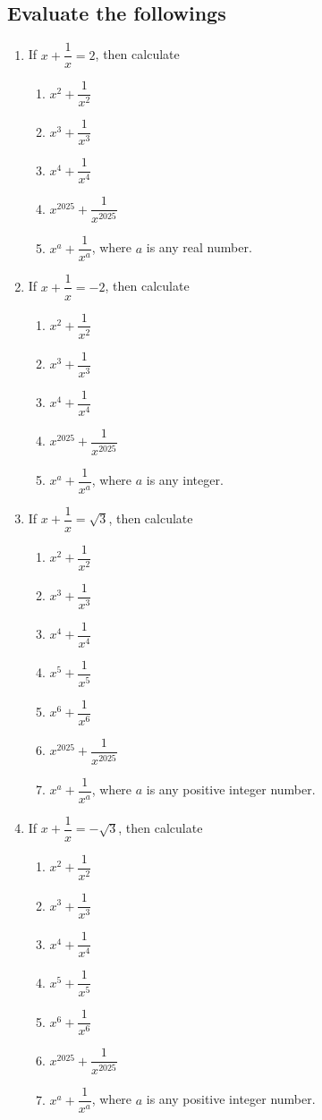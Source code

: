 \documentclass[12pt,a4paper,twoside]{book}
\begin{document}
	\subsection{Evaluate the followings}
		\begin{enumerate}
			\item If $x+\dfrac{1}{x}= 2$, then calculate \begin{enumerate}[label=(\alph*)]
				\item $x^2+\dfrac{1}{x^2}$
				\item $x^3+\dfrac{1}{x^3}$
				\item $x^4+\dfrac{1}{x^4}$
				\item $x^{2025}+\dfrac{1}{x^{2025}}$
				\item $x^a+\dfrac{1}{x^a}$, where $a$ is any real number.
			\end{enumerate} 
			\item If $x+\dfrac{1}{x}= -2$, then calculate \begin{enumerate}[label=(\alph*)]
				\item $x^2+\dfrac{1}{x^2}$
				\item $x^3+\dfrac{1}{x^3}$
				\item $x^4+\dfrac{1}{x^4}$
				\item $x^{2025}+\dfrac{1}{x^{2025}}$
				\item $x^a+\dfrac{1}{x^a}$, where $a$ is any integer.
			\end{enumerate} 
			\item If $x+\dfrac{1}{x}= \sqrt{3}$, then calculate \begin{enumerate}[label=(\alph*)]
				\item $x^2+\dfrac{1}{x^2}$
				\item $x^3+\dfrac{1}{x^3}$
				\item $x^4+\dfrac{1}{x^4}$
				\item $x^5+\dfrac{1}{x^5}$
				\item $x^6+\dfrac{1}{x^6}$
				\item $x^{2025}+\dfrac{1}{x^{2025}}$
				\item $x^a+\dfrac{1}{x^a}$, where $a$ is any positive integer number.
			\end{enumerate}
			\item If $x+\dfrac{1}{x}= -\sqrt{3}$, then calculate \begin{enumerate}[label=(\alph*)]
				\item $x^2+\dfrac{1}{x^2}$
				\item $x^3+\dfrac{1}{x^3}$
				\item $x^4+\dfrac{1}{x^4}$
				\item $x^5+\dfrac{1}{x^5}$
				\item $x^6+\dfrac{1}{x^6}$
				\item $x^{2025}+\dfrac{1}{x^{2025}}$
				\item $x^a+\dfrac{1}{x^a}$, where $a$ is any positive integer number.
			\end{enumerate}
			
		\end{enumerate}
\end{document}
